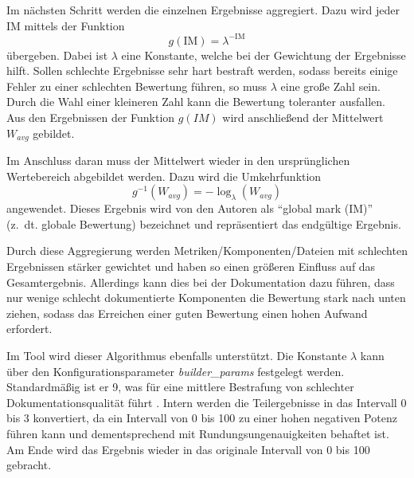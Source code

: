  Im nächsten Schritt werden die einzelnen Ergebnisse aggregiert. Dazu wird jeder IM mittels der Funktion
 \begin{equation}
     g(\text{IM})=\lambda^{-\text{IM}}
 \end{equation} übergeben. Dabei ist $\lambda$ eine Konstante, welche bei der Gewichtung der Ergebnisse hilft. Sollen schlechte Ergebnisse sehr hart bestraft werden, sodass bereits einige Fehler zu einer schlechten Bewertung führen, so muss $\lambda$ eine große Zahl sein. Durch die Wahl einer kleineren Zahl kann die Bewertung toleranter ausfallen. Aus den Ergebnissen der Funktion $g(IM)$ wird anschließend der Mittelwert $W_{avg}$ gebildet.
 
 Im Anschluss daran muss der Mittelwert wieder in den ursprünglichen Wertebereich abgebildet werden. Dazu wird die Umkehrfunktion
 \begin{equation}
     g^{-1}(W_{avg})=-\log_\lambda (W_{avg})
 \end{equation} angewendet. Dieses Ergebnis wird von den Autoren als \enquote{global mark (IM)} (z.~dt. globale Bewertung) bezeichnet und repräsentiert das endgültige Ergebnis.
 
 Durch diese Aggregierung werden Metriken/Komponenten/Dateien mit schlechten Ergebnissen stärker gewichtet und haben so einen größeren Einfluss auf das Gesamtergebnis. Allerdings kann dies bei der Dokumentation dazu führen, dass nur wenige schlecht dokumentierte Komponenten die Bewertung stark nach unten ziehen, sodass das Erreichen einer guten Bewertung einen hohen Aufwand erfordert. 
 
 Im Tool wird dieser Algorithmus ebenfalls unterstützt. Die Konstante $\lambda$ kann über den Konfigurationsparameter \textit{builder\_params} festgelegt werden. Standardmäßig ist er 9, was für eine mittlere Bestrafung von schlechter Dokumentationsqualität führt \cite[S. 1127]{Softwarequalitymetricsaggregationinindustry}. Intern werden die Teilergebnisse in das Intervall 0 bis 3 konvertiert, da ein Intervall von 0 bis 100 zu einer hohen negativen Potenz führen kann und dementsprechend mit Rundungsungenauigkeiten behaftet ist. Am Ende wird das Ergebnis wieder in das originale Intervall von 0 bis 100 gebracht. 
 
 
 

 
 